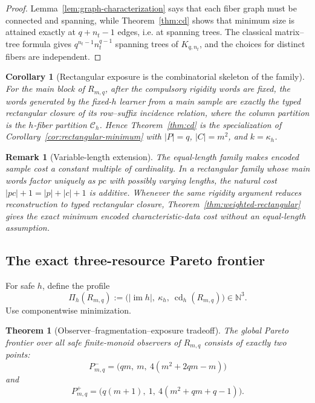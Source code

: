 \documentclass[11pt]{article}
\newtheorem{theorem}[definition]{Theorem}
\newtheorem{corollary}[definition]{Corollary}
\newtheorem{remark}[definition]{Remark}
\newcommand{\im}{\operatorname{im}}
\newcommand{\cd}{\operatorname{cd}}
\begin{document}
\begin{proof}
Lemma~\ref{lem:graph-characterization} says that each fiber graph must be
connected and spanning, while Theorem~\ref{thm:cd} shows that minimum size is
attained exactly at $q+n_t-1$ edges, i.e. at spanning trees.  The classical
matrix--tree formula gives $q^{n_t-1}n_t^{q-1}$ spanning trees of
$K_{q,n_t}$, and the choices for distinct fibers are independent.
\end{proof}

\begin{corollary}[Rectangular exposure is the combinatorial skeleton of the family]
\label{cor:family-rectangular}
For the main block of $R_{m,q}$, after the compulsory rigidity words are fixed,
the words generated by the fixed-$h$ learner from a main sample are exactly
the typed rectangular closure of its row--suffix incidence relation, where the
column partition is the $h$-fiber partition $\mathcal C_h$.  Hence
Theorem~\ref{thm:cd} is the specialization of
Corollary~\ref{cor:rectangular-minimum} with $|P|=q$, $|C|=m^2$, and
$k=\kappa_h$.
\end{corollary}

\begin{remark}[Variable-length extension]
The equal-length family makes encoded sample cost a constant multiple of
cardinality.  In a rectangular family whose main words factor uniquely as
$pc$ with possibly varying lengths, the natural cost
$|pc|+1=|p|+|c|+1$ is additive.  Whenever the same rigidity argument reduces
reconstruction to typed rectangular closure,
Theorem~\ref{thm:weighted-rectangular} gives the exact minimum encoded
characteristic-data cost without an equal-length assumption.
\end{remark}

\subsection{The exact three-resource Pareto frontier}

For safe $h$, define the profile
\[
 \Pi_h(R_{m,q})
 :=
 \bigl(|\im h|,\ \kappa_h,\ \cd_h(R_{m,q})\bigr)
 \in\mathbb N^3.
\]
Use componentwise minimization.

\begin{theorem}[Observer--fragmentation--exposure tradeoff]
\label{thm:frontier}
The global Pareto frontier over all safe finite-monoid observers of
$R_{m,q}$ consists of exactly two points:
\[
 \boxed{
 P^-_{m,q}
 =
 \bigl(qm,\ m,\ 4(m^2+2qm-m)\bigr)
 }
\]
and
\[
 \boxed{
 P^+_{m,q}
 =
 \bigl(q(m+1),\ 1,\ 4(m^2+qm+q-1)\bigr).
 }
\]
\end{theorem}
\end{document}
